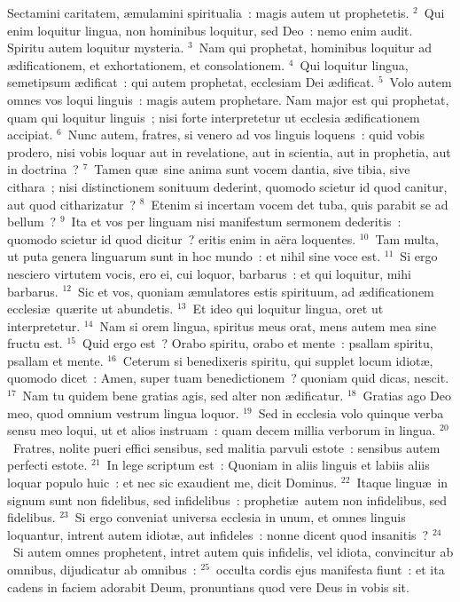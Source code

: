 \lettrine[lines=10,image=true,loversize=0.05,lraise=-0.03]{S}{}ectamini caritatem, \ae mulamini spiritualia~: magis autem ut prophetetis.
${}^{2}$~Qui enim loquitur lingua, non hominibus loquitur, sed Deo~: nemo enim audit. Spiritu autem loquitur mysteria.
${}^{3}$~Nam qui prophetat, hominibus loquitur ad \ae dificationem, et exhortationem, et consolationem.
${}^{4}$~Qui loquitur lingua, semetipsum \ae dificat~: qui autem prophetat, ecclesiam Dei \ae dificat.
${}^{5}$~Volo autem omnes vos loqui linguis~: magis autem prophetare. Nam major est qui prophetat, quam qui loquitur linguis~; nisi forte interpretetur ut ecclesia \ae dificationem accipiat.
${}^{6}$~Nunc autem, fratres, si venero ad vos linguis loquens~: quid vobis prodero, nisi vobis loquar aut in revelatione, aut in scientia, aut in prophetia, aut in doctrina~?
${}^{7}$~Tamen qu\ae\ sine anima sunt vocem dantia, sive tibia, sive cithara~; nisi distinctionem sonituum dederint, quomodo scietur id quod canitur, aut quod citharizatur~?
${}^{8}$~Etenim si incertam vocem det tuba, quis parabit se ad bellum~?
${}^{9}$~Ita et vos per linguam nisi manifestum sermonem dederitis~: quomodo scietur id quod dicitur~? eritis enim in a\"era loquentes.
${}^{10}$~Tam multa, ut puta genera linguarum sunt in hoc mundo~: et nihil sine voce est.
${}^{11}$~Si ergo nesciero virtutem vocis, ero ei, cui loquor, barbarus~: et qui loquitur, mihi barbarus.
${}^{12}$~Sic et vos, quoniam \ae mulatores estis spirituum, ad \ae dificationem ecclesi\ae\ qu\ae rite ut abundetis.
${}^{13}$~Et ideo qui loquitur lingua, oret ut interpretetur.
${}^{14}$~Nam si orem lingua, spiritus meus orat, mens autem mea sine fructu est.
${}^{15}$~Quid ergo est~? Orabo spiritu, orabo et mente~: psallam spiritu, psallam et mente.
${}^{16}$~Ceterum si benedixeris spiritu, qui supplet locum idiot\ae , quomodo dicet~: Amen, super tuam benedictionem~? quoniam quid dicas, nescit.
${}^{17}$~Nam tu quidem bene gratias agis, sed alter non \ae dificatur.
${}^{18}$~Gratias ago Deo meo, quod omnium vestrum lingua loquor.
${}^{19}$~Sed in ecclesia volo quinque verba sensu meo loqui, ut et alios instruam~: quam decem millia verborum in lingua.
${}^{20}$~Fratres, nolite pueri effici sensibus, sed malitia parvuli estote~: sensibus autem perfecti estote.
${}^{21}$~In lege scriptum est~: Quoniam in aliis linguis et labiis aliis loquar populo huic~: et nec sic exaudient me, dicit Dominus.
${}^{22}$~Itaque lingu\ae\ in signum sunt non fidelibus, sed infidelibus~: propheti\ae\ autem non infidelibus, sed fidelibus.
${}^{23}$~Si ergo conveniat universa ecclesia in unum, et omnes linguis loquantur, intrent autem idiot\ae , aut infideles~: nonne dicent quod insanitis~?
${}^{24}$~Si autem omnes prophetent, intret autem quis infidelis, vel idiota, convincitur ab omnibus, dijudicatur ab omnibus~:
${}^{25}$~occulta cordis ejus manifesta fiunt~: et ita cadens in faciem adorabit Deum, pronuntians quod vere Deus in vobis sit.


